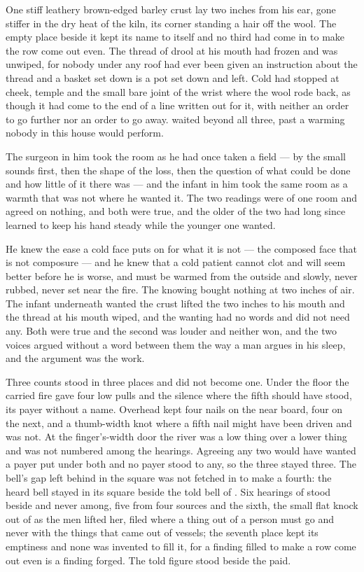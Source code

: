 One stiff leathery brown-edged barley crust lay two inches from his ear, gone stiffer in the dry heat of the kiln, its corner standing a hair off the wool. The empty place beside it kept its name to itself and no third had come in to make the row come out even. The thread of drool at his mouth had frozen and was unwiped, for nobody under any roof had ever been given an instruction about the thread and a basket set down is a pot set down and left. Cold had stopped at cheek, temple and the small bare joint of the wrist where the wool rode back, as though it had come to the end of a line written out for it, with neither an order to go further nor an order to go away.  waited beyond all three, past a warming nobody in this house would perform.

The surgeon in him took the room as he had once taken a field --- by the small sounds first, then the shape of the loss, then the question of what could be done and how little of it there was --- and the infant in him took the same room as a warmth that was not where he wanted it. The two readings were of one room and agreed on nothing, and both were true, and the older of the two had long since learned to keep his hand steady while the younger one wanted.

He knew the ease a cold face puts on for what it is not --- the composed face that is not composure --- and he knew that a cold patient cannot clot and will seem better before he is worse, and must be warmed from the outside and slowly, never rubbed, never set near the fire. The knowing bought nothing at two inches of air. The infant underneath wanted the crust lifted the two inches to his mouth and the thread at his mouth wiped, and the wanting had no words and did not need any. Both were true and the second was louder and neither won, and the two voices argued without a word between them the way a man argues in his sleep, and the argument was the work.

Three counts stood in three places and did not become one. Under the floor the carried fire gave four low pulls and the silence where the fifth should have stood, its payer without a name. Overhead  kept four nails on the near board, four on the next, and a thumb-width knot where a fifth nail might have been driven and was not. At the finger's-width door the river was a low thing over a lower thing and was not numbered among the hearings. Agreeing any two would have wanted a payer put under both and no payer stood to any, so the three stayed three. The bell's gap left behind in the square was not fetched in to make a fourth: the heard bell stayed in its square beside the told bell of . Six hearings of  stood beside and never among, five from four sources and the sixth, the small flat knock out of  as the men lifted her, filed where a thing out of a person must go and never with the things that came out of vessels; the seventh place kept its emptiness and none was invented to fill it, for a finding filled to make a row come out even is a finding forged. The told figure stood beside the paid.

